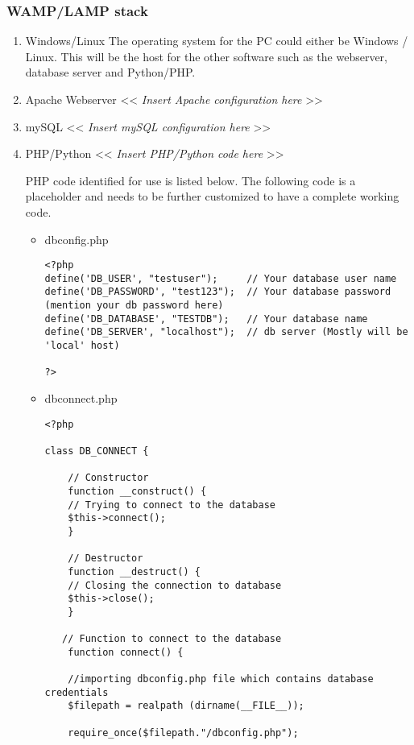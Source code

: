 \documentclass[a4paper,oneside]{article}
\begin{document}
\subsubsection{WAMP/LAMP stack}
\label{sec:org1904666}
\begin{enumerate}
\item Windows/Linux
\label{sec:orga807008}
The operating system for the PC could either be Windows / Linux. This
will be the host for the other software such as the webserver,
database server and Python/PHP.
\item Apache Webserver
\label{sec:orgd2b9e2b}
<< \emph{Insert Apache configuration here} >>
\item mySQL
\label{sec:orgc3fa1a0}
<< \emph{Insert mySQL configuration here} >>
\item PHP/Python
\label{sec:orgacaee96}
<< \emph{Insert PHP/Python code here} >> 

PHP code identified for use is listed below. The following code is a
placeholder and needs to be further customized to have a complete
working code.

\begin{itemize}
\item dbconfig.php
\label{sec:orgc6a7b30}
\begin{verbatim}
<?php
define('DB_USER', "testuser");     // Your database user name
define('DB_PASSWORD', "test123");  // Your database password (mention your db password here)
define('DB_DATABASE', "TESTDB");   // Your database name
define('DB_SERVER', "localhost");  // db server (Mostly will be 'local' host)

?>
\end{verbatim}

\item dbconnect.php
\label{sec:orge46cf52}
\begin{verbatim}
<?php

class DB_CONNECT {

    // Constructor
    function __construct() {
	// Trying to connect to the database
	$this->connect();
    }

    // Destructor
    function __destruct() {
	// Closing the connection to database
	$this->close();
    }

   // Function to connect to the database
    function connect() {

	//importing dbconfig.php file which contains database credentials 
	$filepath = realpath (dirname(__FILE__));

	require_once($filepath."/dbconfig.php");


\end{verbatim}
\end{itemize}
\end{enumerate}
\end{document}
